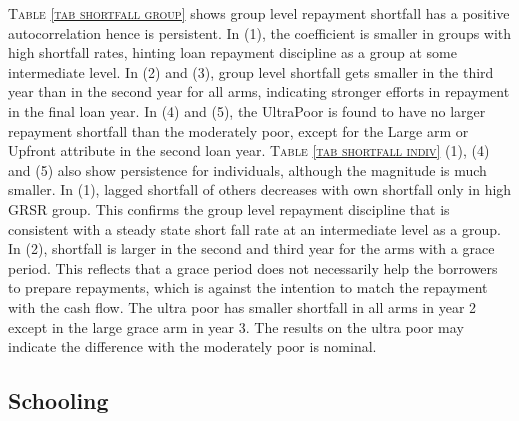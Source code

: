 \begin{palepinkleftbar}
\begin{finding}
\textsc{\small Table \ref{tab shortfall group}} shows group level repayment shortfall has a positive autocorrelation hence is persistent. In (1), the coefficient is smaller in groups with high shortfall rates, hinting loan repayment discipline as a group at some intermediate level. In (2) and (3), group level shortfall gets smaller in the third year than in the second year for all arms, indicating stronger efforts in repayment in the final loan year. In (4) and (5), the \textsf{UltraPoor} is found to have no larger repayment shortfall than the moderately poor, except for the \textsf{Large} arm or \textsf{Upfront} attribute in the second loan year. \textsc{\small Table \ref{tab shortfall indiv}} (1), (4) and (5) also show persistence for individuals, although the magnitude is much smaller. In (1), lagged shortfall of others decreases with own shortfall only in high GRSR group. This confirms the group level repayment discipline that is consistent with a steady state short fall rate at an intermediate level as a group.  In (2), shortfall is larger in the second and third year for the arms with a grace period. This reflects that a grace period does not necessarily help the borrowers to prepare repayments, which is against the intention to match the repayment with the cash flow. The ultra poor has smaller shortfall in all arms in year 2 except in the large grace arm in year 3. The results on the ultra poor may indicate the difference with the moderately poor is nominal.
\end{finding}
\end{palepinkleftbar}

\subsection{Schooling}

